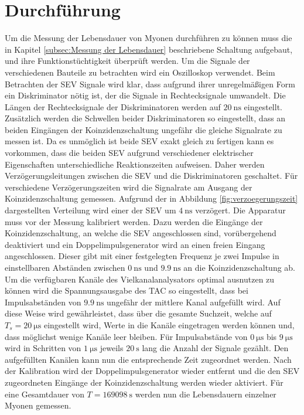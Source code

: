 \section{Durchführung}
\label{sec:Durchführung}
Um die Messung der Lebensdauer von Myonen durchführen zu können muss die in Kapitel \ref{subsec:Messung der Lebensdauer} beschriebene Schaltung aufgebaut, und ihre Funktionstüchtigkeit überprüft werden.
Um die Signale der verschiedenen Bauteile zu betrachten wird ein Oszilloskop verwendet.
Beim Betrachten der SEV Signale wird klar, dass aufgrund ihrer unregelmäßigen Form ein Diskriminator nötig ist, der die Signale in Rechtecksignale umwandelt.
Die Längen der Rechtecksignale der Diskriminatoren werden auf $\SI{20}{\nano\second}$ eingestellt.
Zusätzlich werden die Schwellen beider Diskriminatoren so eingestellt, dass an beiden Eingängen der Koinzidenzschaltung ungefähr die gleiche Signalrate zu messen ist.
Da es unmöglich ist beide SEV exakt gleich zu fertigen kann es vorkommen, dass die beiden SEV aufgrund verschiedener elektrischer Eigenschaften unterschiedliche Reaktionszeiten aufweisen.
Daher werden Verzögerungsleitungen zwischen die SEV und die Diskriminatoren geschaltet.
Für verschiedene Verzögerungszeiten wird die Signalrate am Ausgang der Koinzidenzschaltung gemessen.
Aufgrund der in Abbildung \ref{fig:verzoegerungszeit} dargestellten Verteilung wird einer der SEV um $\SI{4}{\nano\second}$ verzögert.
\label{fig:verzoegerungszeit}
Die Apparatur muss vor der Messung kalibriert werden.
Dazu werden die Eingänge der Koinzidenzschaltung, an welche die SEV angeschlossen sind, vorübergehend deaktiviert und ein Doppelimpulsgenerator wird an einen freien Eingang angeschlossen.
Dieser gibt mit einer festgelegten Frequenz je zwei Impulse in einstellbaren Abständen zwischen $\SI{0}{\nano\second}$ und $\SI{9.9}{\nano\second}$ an die Koinzidenzschaltung ab.
Um die verfügbaren Kanäle des Vielkanalanalysators optimal ausnutzen zu können wird die Spannungsausgabe des TAC so eingestellt, dass bei Impulsabständen von $\SI{9.9}{\nano\second}$ ungefähr der mittlere Kanal aufgefüllt wird.
Auf diese Weise wird gewährleistet, dass über die gesamte Suchzeit, welche auf $T_s=\SI{20}{\micro\second}$ eingestellt wird, Werte in die Kanäle eingetragen werden können und, dass möglichst wenige Kanäle leer bleiben.
Für Impulsabstände von $\SI{0}{\micro\second}$ bis $\SI{9}{\micro\second}$ wird in Schritten von $\SI{1}{\micro\second}$ jeweils $\SI{20}{\second}$ lang die Anzahl der Signale gezählt.
Den aufgefüllten Kanälen kann nun die entsprechende Zeit zugeordnet werden.
Nach der Kalibration wird der Doppelimpulsgenerator wieder entfernt und die den SEV zugeordneten Eingänge der Koinzidenzschaltung werden wieder aktiviert.
Für eine Gesamtdauer von $T=\SI{169098}{\second}$ werden nun die Lebensdauern einzelner Myonen gemessen.
